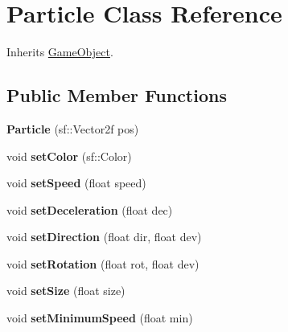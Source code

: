 \hypertarget{class_particle}{\section{Particle Class Reference}
\label{class_particle}
}


Inherits \hyperlink{class_game_object}{Game\+Object}.

\subsection*{Public Member Functions}
\begin{DoxyCompactItemize}
\item 
\hypertarget{class_particle_aeb1cb89169a8cd1ebdf9620e6f2f6566}{{\bfseries Particle} (sf\+::\+Vector2f pos)}\label{class_particle_aeb1cb89169a8cd1ebdf9620e6f2f6566}

\item 
\hypertarget{class_particle_afad70dcca52de78b900342b29e68f895}{void {\bfseries set\+Color} (sf\+::\+Color)}\label{class_particle_afad70dcca52de78b900342b29e68f895}

\item 
\hypertarget{class_particle_ac57a8908b8ab1a1b9bb29aa02e347f56}{void {\bfseries set\+Speed} (float speed)}\label{class_particle_ac57a8908b8ab1a1b9bb29aa02e347f56}

\item 
\hypertarget{class_particle_a87a76728e3b91795c52beb9257e7e9df}{void {\bfseries set\+Deceleration} (float dec)}\label{class_particle_a87a76728e3b91795c52beb9257e7e9df}

\item 
\hypertarget{class_particle_a2e6c588a1cb9607ef70f3d97edefd780}{void {\bfseries set\+Direction} (float dir, float dev)}\label{class_particle_a2e6c588a1cb9607ef70f3d97edefd780}

\item 
\hypertarget{class_particle_a8472fac4770b3d198426e480ccef97d5}{void {\bfseries set\+Rotation} (float rot, float dev)}\label{class_particle_a8472fac4770b3d198426e480ccef97d5}

\item 
\hypertarget{class_particle_a9cbcb7c7f4b1f1d11033a9eea16bae2c}{void {\bfseries set\+Size} (float size)}\label{class_particle_a9cbcb7c7f4b1f1d11033a9eea16bae2c}

\item 
\hypertarget{class_particle_aed19fba4d00acaa104bf1030c99b99e9}{void {\bfseries set\+Minimum\+Speed} (float min)}\label{class_particle_aed19fba4d00acaa104bf1030c99b99e9}


\end{DoxyCompactItemize}

